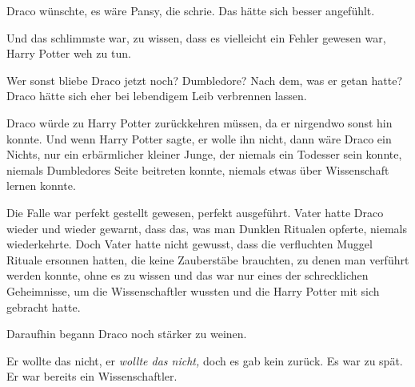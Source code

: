 Draco wünschte, es wäre Pansy, die schrie. Das hätte sich besser angefühlt.

Und das schlimmste war, zu wissen, dass es vielleicht ein Fehler gewesen war, Harry Potter weh zu tun.

Wer sonst bliebe Draco jetzt noch? Dumbledore? Nach dem, was er getan hatte? Draco hätte sich eher bei lebendigem Leib verbrennen lassen.

Draco würde zu Harry Potter zurückkehren müssen, da er nirgendwo sonst hin konnte. Und wenn Harry Potter sagte, er wolle ihn nicht, dann wäre Draco ein Nichts, nur ein erbärmlicher kleiner Junge, der niemals ein Todesser sein konnte, niemals Dumbledores Seite beitreten konnte, niemals etwas über Wissenschaft lernen konnte.

Die Falle war perfekt gestellt gewesen, perfekt ausgeführt. Vater hatte Draco wieder und wieder gewarnt, dass das, was man Dunklen Ritualen opferte, niemals wiederkehrte. Doch Vater hatte nicht gewusst, dass die verfluchten Muggel Rituale ersonnen hatten, die keine Zauberstäbe brauchten, zu denen man verführt werden konnte, ohne es zu wissen und das war nur eines der schrecklichen Geheimnisse, um die Wissenschaftler wussten und die Harry Potter mit sich gebracht hatte.

Daraufhin begann Draco noch stärker zu weinen.

Er wollte das nicht, er \emph{wollte das nicht,} doch es gab kein zurück. Es war zu spät. Er war bereits ein Wissenschaftler.

